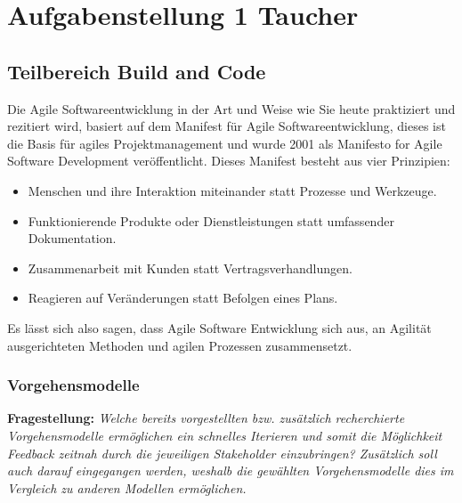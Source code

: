 \newpage
\section{Aufgabenstellung 1 Taucher}

                      


\subsection{Teilbereich Build and Code}
Die Agile Softwareentwicklung in der Art und Weise wie Sie heute praktiziert und rezitiert wird, basiert auf 
dem Manifest für Agile Softwareentwicklung, dieses ist die Basis für agiles Projektmanagement und wurde
2001 als Manifesto for Agile Software Development veröffentlicht. Dieses Manifest besteht aus vier Prinzipien:
\begin{itemize}
    \item Menschen und ihre Interaktion miteinander statt Prozesse und Werkzeuge.
    \item Funktionierende Produkte oder Dienstleistungen statt umfassender Dokumentation.
    \item Zusammenarbeit mit Kunden statt Vertragsverhandlungen.
    \item Reagieren auf Veränderungen statt Befolgen eines Plans. \cite{agile-manifesto}
\end{itemize} 
  
Es lässt sich also sagen, dass Agile Software Entwicklung sich aus, an Agilität ausgerichteten 
Methoden und agilen Prozessen zusammensetzt. 

\subsubsection{Vorgehensmodelle}
\textbf{Fragestellung:} \textit{Welche bereits vorgestellten bzw. zusätzlich recherchierte Vorgehensmodelle ermöglichen ein
schnelles Iterieren und somit die Möglichkeit Feedback zeitnah durch die jeweiligen Stakeholder
einzubringen? Zusätzlich soll auch darauf eingegangen werden, weshalb die gewählten
Vorgehensmodelle dies im Vergleich zu anderen Modellen ermöglichen.}
\\


